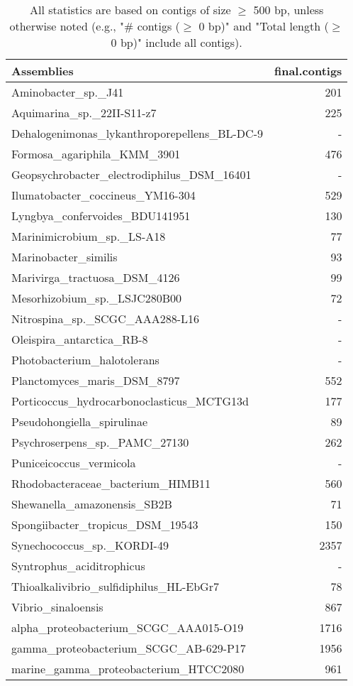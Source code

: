 \documentclass[12pt,a4paper]{article}
\begin{document}
\begin{table}[ht]
\begin{center}
\caption{All statistics are based on contigs of size $\geq$ 500 bp, unless otherwise noted (e.g., "\# contigs ($\geq$ 0 bp)" and "Total length ($\geq$ 0 bp)" include all contigs).}
\begin{tabular}{|l*{1}{|r}|}
\hline
Assemblies & final.contigs \\ \hline
Aminobacter\_sp.\_J41 & 201 \\ \hline
Aquimarina\_sp.\_22II-S11-z7 & 225 \\ \hline
Dehalogenimonas\_lykanthroporepellens\_BL-DC-9 & - \\ \hline
Formosa\_agariphila\_KMM\_3901 & 476 \\ \hline
Geopsychrobacter\_electrodiphilus\_DSM\_16401 & - \\ \hline
Ilumatobacter\_coccineus\_YM16-304 & 529 \\ \hline
Lyngbya\_confervoides\_BDU141951 & 130 \\ \hline
Marinimicrobium\_sp.\_LS-A18 & 77 \\ \hline
Marinobacter\_similis & 93 \\ \hline
Marivirga\_tractuosa\_DSM\_4126 & 99 \\ \hline
Mesorhizobium\_sp.\_LSJC280B00 & 72 \\ \hline
Nitrospina\_sp.\_SCGC\_AAA288-L16 & - \\ \hline
Oleispira\_antarctica\_RB-8 & - \\ \hline
Photobacterium\_halotolerans & - \\ \hline
Planctomyces\_maris\_DSM\_8797 & 552 \\ \hline
Porticoccus\_hydrocarbonoclasticus\_MCTG13d & 177 \\ \hline
Pseudohongiella\_spirulinae & 89 \\ \hline
Psychroserpens\_sp.\_PAMC\_27130 & 262 \\ \hline
Puniceicoccus\_vermicola & - \\ \hline
Rhodobacteraceae\_bacterium\_HIMB11 & 560 \\ \hline
Shewanella\_amazonensis\_SB2B & 71 \\ \hline
Spongiibacter\_tropicus\_DSM\_19543 & 150 \\ \hline
Synechococcus\_sp.\_KORDI-49 & 2357 \\ \hline
Syntrophus\_aciditrophicus & - \\ \hline
Thioalkalivibrio\_sulfidiphilus\_HL-EbGr7 & 78 \\ \hline
Vibrio\_sinaloensis & 867 \\ \hline
alpha\_proteobacterium\_SCGC\_AAA015-O19 & 1716 \\ \hline
gamma\_proteobacterium\_SCGC\_AB-629-P17 & 1956 \\ \hline
marine\_gamma\_proteobacterium\_HTCC2080 & 961 \\ \hline
\end{tabular}
\end{center}
\end{table}
\end{document}
